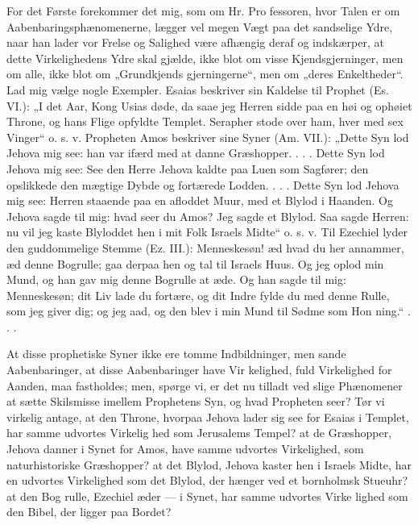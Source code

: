 \documentclass[12pt]{book}
\newcommand{\opage}[1]{\marginnote{\footnotesize\textit{[#1]}}}
\begin{document}
For det Første forekommer det mig, som om Hr. Pro\-%
fessoren, hvor Talen er om Aabenbaringsphænomenerne, lægger
vel megen Vægt paa det sandselige Ydre, naar han lader
vor Frelse og Salighed være afhængig deraf og indskærper,
at dette Virkelighedens Ydre skal gjælde, ikke blot om visse
Kjendsgjerninger, men om alle, ikke blot om „Grundkjends\-%
gjerningerne“, men om „deres Enkeltheder“. Lad mig vælge
nogle Exempler. Esaias beskriver sin Kaldelse til Prophet
(Es. VI.): „I det Aar, Kong Usias døde, da saae jeg Herren
sidde paa en høi og ophøiet Throne, og hans Flige opfyldte
Templet. Serapher stode over ham, hver med sex Vinger“
\opage{300}\setcounter{footnote}{0}%
o. s. v. Propheten Amos beskriver sine Syner (Am. VII.):
„Dette Syn lod Jehova mig see: han var ifærd med at danne
Græshopper. . . . Dette Syn lod Jehova mig see: See den
Herre Jehova kaldte paa Luen som Sagfører; den opslikkede
den mægtige Dybde og fortærede Lodden. . . . Dette Syn
lod Jehova mig see: Herren staaende paa en afloddet Muur,
med et Blylod i Haanden. Og Jehova sagde til mig: hvad
seer du Amos? Jeg sagde et Blylod. Saa sagde Herren:
nu vil jeg kaste Blyloddet hen i mit Folk Israels Midte“
o. s. v. Til Ezechiel lyder den guddommelige Stemme (Ez.
III.): Menneskesøn! æd hvad du her annammer, æd denne
Bogrulle; gaa derpaa hen og tal til Israels Huus. Og jeg
oplod min Mund, og han gav mig denne Bogrulle at æde.
Og han sagde til mig: Menneskesøn; dit Liv lade du fortære,
og dit Indre fylde du med denne Rulle, som jeg giver dig;
og jeg aad, og den blev i min Mund til Sødme som Hon\-%
ning.“ . . .

At disse prophetiske Syner ikke ere tomme Indbildninger,
men sande Aabenbaringer, at disse Aabenbaringer have Vir\-%
kelighed, fuld Virkelighed for Aanden, maa fastholdes; men,
spørge vi, er det nu tilladt ved slige Phænomener at sætte
Skilsmisse imellem Prophetens Syn, og hvad Propheten seer?
Tør vi virkelig antage, at den Throne, hvorpaa Jehova lader
sig see for Esaias i Templet, har samme udvortes Virkelig\-%
hed som Jerusalems Tempel? at de Græshopper, Jehova
danner i Synet for Amos, have samme udvortes Virkelighed,
som naturhistoriske Græshopper? at det Blylod, Jehova kaster
hen i Israels Midte, har en udvortes Virkelighed som det
Blylod, der hænger ved et bornholmsk Stueuhr? at den Bog\-%
rulle, Ezechiel æder --- i Synet, har samme udvortes Virke\-%
lighed som den Bibel, der ligger paa Bordet?
\end{document}
